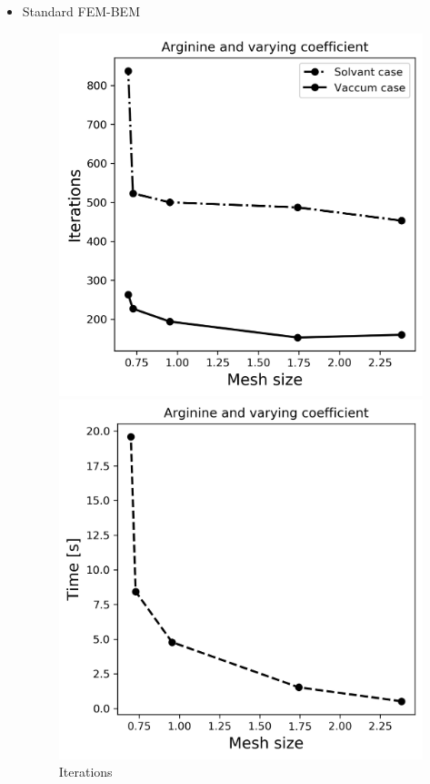     \begin{itemize}
        \item Standard FEM-BEM
\begin{figure}[!htb]
  \includegraphics[width=\linewidth]{FEM_BEM_Arginine_varying_coeff_iter.png}
  \caption{Iterations}
\endminipage\hfill
{}%
  \includegraphics[width=\linewidth]{FEM_BEM_Arginine_varying_coeff_time.png}

\end{figure}
\end{itemize}
